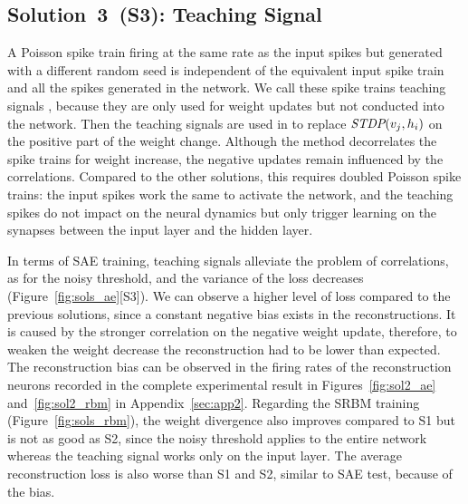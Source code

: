 \subsection{Solution~3~(S3): Teaching Signal}
A Poisson spike train firing at the same rate as the input spikes but generated with a different random seed is independent of the equivalent input spike train and all the spikes generated in the network.
We call these spike trains teaching signals \DIFdelbegin {}\DIFdelend \DIFaddbegin {}\DIFaddend , because they are only used for weight updates but not conducted into the network.
Then the teaching signals are used in \DIFdelbegin {}\DIFdelend \DIFaddbegin {}\DIFaddend to replace $\textit{\textrm{STDP}}(v_j,h_i)$ on the positive part of the weight change.
Although the method decorrelates the spike trains for weight increase, the negative updates remain influenced by the correlations.  
Compared to the other solutions, this requires doubled Poisson spike trains: the input spikes work the same to activate the network, and the teaching spikes do not impact on the neural dynamics but only trigger learning on the synapses between the input layer and the hidden layer.

In terms of SAE training, teaching signals alleviate the problem of correlations, as for the noisy threshold, and the variance of the loss decreases (Figure~\ref{fig:sols_ae}[S3]).
We can observe a higher level of loss compared to the previous solutions, since a constant negative bias exists in the reconstructions.
It is caused by the stronger correlation on the negative weight update, therefore, to weaken the weight decrease the reconstruction had to be lower than expected.  
The reconstruction bias can be observed in the firing rates of the reconstruction neurons recorded in the complete experimental result in Figures~\ref{fig:sol2_ae} and~\ref{fig:sol2_rbm} in Appendix~\ref{sec:app2}.
Regarding the SRBM training (Figure~\ref{fig:sols_rbm}), the weight divergence also improves compared to S1 but is not as good as S2, since the noisy threshold applies to the entire network whereas the teaching signal works only on the input layer.
The average reconstruction loss is also worse than S1 and S2, similar to SAE test, because of the \DIFaddbegin {}\DIFaddend bias. 


